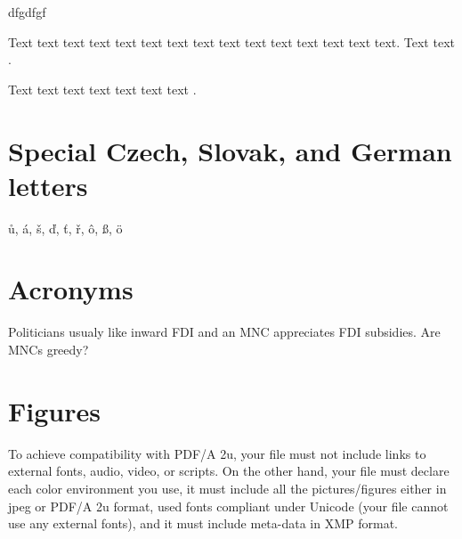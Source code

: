 dfgdfgf

\label{sec:citace}

Text text text text text text text text text text text text text text text. Text text  \citet{Haufler2006}.

Text text text text text text text \cite[see, ,][pg.~10]{Haaparanta1996}. 

\section{Special Czech, Slovak, and German letters}

\r{u}, \'{a}, \v{s}, \v{d}, \v{t}, \v{r}, \^{o}, \ss{}, \"{o}

\section{Acronyms}

Politicians usualy like inward \ac{FDI} and an \ac{MNC} appreciates \ac{FDI} subsidies. Are \acp{MNC} greedy?

\section{Figures}

To achieve compatibility with PDF/A 2u, your file must not include links to external fonts, audio, video, or scripts. On the other hand, your file must declare each color environment you use, it must include all the pictures/figures either in jpeg or PDF/A 2u format, used fonts compliant under Unicode (your file cannot use any external fonts), and it must include meta-data in XMP format.


